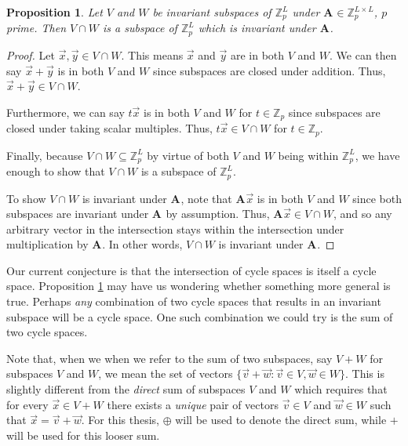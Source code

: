 \documentclass[a4paper, 12pt, reqno]{amsart}
\newtheorem{prop}{Proposition}
\newcommand{\Z}{\mathbb{Z}}
\newcommand\Mat[2][]{\mathbf{#1}^{\!#2}}
\begin{document}
	\begin{prop}
		\label{prop:cycSpaceIntersectSubspace}
		Let $V$ and $W$ be invariant subspaces of $\Z_p^L$ under $\Mat[A]{} \in \Z_p^{L \times L}$, $p$ prime. Then $V \cap W$ is a subspace of $\Z_p^L$ which is invariant 
		under $\Mat[A]{}$.
	\end{prop}
	\begin{proof}
		Let $\vec{x}, \vec{y} \in V \cap W$. This means $\vec{x}$ and $\vec{y}$ are in both $V$ and $W$. We can then say $\vec{x} + \vec{y}$ is in both $V$ and $W$ since 
		subspaces are closed under addition. Thus, $\vec{x} + \vec{y} \in V \cap W$.
		
		Furthermore, we can say $t\vec{x}$ is in both $V$ and $W$ for $t \in \Z_p$ since subspaces are closed under taking scalar multiples. Thus, $t\vec{x} \in V \cap W$ for 
		$t \in \Z_p$.
		
		Finally, because $V \cap W \subseteq \Z_p^L$ by virtue of both $V$ and $W$ being within $\Z_p^L$, we have enough to show that $V \cap W$ is a subspace of $\Z_p^L$.
		
		To show $V \cap W$ is invariant under $\Mat[A]{}$, note that $\Mat[A]{}\vec{x}$ is in both $V$ and $W$ since both subspaces are invariant under $\Mat[A]{}$ by 
		assumption. Thus, $\Mat[A]{}\vec{x} \in V \cap W$, and so any arbitrary vector in the intersection stays within the intersection under multiplication by $\Mat[A]{}$. 
		In other words, $V \cap W$ is invariant under $\Mat[A]{}$.
	\end{proof}

	Our current conjecture is that the intersection of cycle spaces is itself a cycle space. Proposition \ref{prop:cycSpaceIntersectSubspace} may have us wondering whether
	something more general is true. Perhaps \emph{any} combination of two cycle spaces that results in an invariant subspace will be a cycle space. One such combination we
	could try is the sum of two cycle spaces.
	
	Note that, when we when we refer to the sum of two subspaces, say $V + W$ for subspaces $V$ and $W$, we mean the set of vectors 
	$\{\vec{v} + \vec{w} : \vec{v} \in V, \vec{w} \in W\}$. This is slightly different from the \emph{direct} sum of subspaces $V$ and $W$ which requires that for every
	$\vec{x} \in V + W$ there exists a \emph{unique} pair of vectors $\vec{v} \in V$ and $\vec{w} \in W$ such that $\vec{x} = \vec{v} + \vec{w}$. For this thesis, $\oplus$ will
	be used to denote the direct sum, while $+$ will be used for this looser sum.
	
\end{document}
